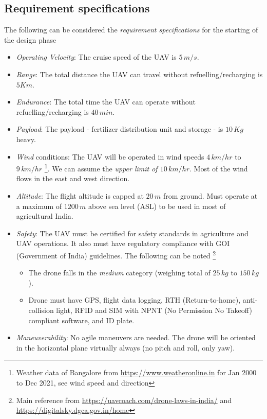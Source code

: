 \subsection{Requirement specifications}

The following can be considered the \emph{requirement specifications} for the starting of the design phase

\begin{itemize}
    \item \textit{Operating Velocity}: The cruise speed of the UAV is $5 \, m/s$.
    \item \textit{Range}: The total distance the UAV can travel without refuelling/recharging is $5 Km$.
    \item \textit{Endurance}: The total time the UAV can operate without refuelling/recharging is $40 \, min$.
    \item \textit{Payload}: The payload - fertilizer distribution unit and storage - is $10 \, Kg$ heavy.
    \item \textit{Wind} conditions: The UAV will be operated in wind speeds $4 \, km/hr$ to $9 \, km/hr$ \footnote{Weather data of Bangalore from \url{https://www.weatheronline.in} for Jan 2000 to Dec 2021, see wind speed and direction}. We can assume the \emph{upper limit of $10 \, km/hr$}. Most of the wind flows in the east and west direction.
    \item \textit{Altitude}: The flight altitude is capped at $20 \, m$ from ground. Must operate at a maximum of $1200\,m$ above sea level (ASL) to be used in most of agricultural India.
    \item \textit{Safety}: The UAV must be certified for safety standards in agriculture and UAV operations. It also must have regulatory compliance with GOI (Government of India) guidelines. The following can be noted \footnote{Main reference from \url{https://uavcoach.com/drone-laws-in-india/} and \url{https://digitalsky.dgca.gov.in/home}}
    \begin{itemize}
        \item The drone falls in the \emph{medium} category (weighing total of $25 \, kg$ to $150 \, kg$).
        \item Drone must have GPS, flight data logging, RTH (Return-to-home), anti-collision light, RFID and SIM with NPNT (No Permission No Takeoff) compliant software, and ID plate.
    \end{itemize}
    \item \textit{Maneuverability}: No agile maneuvers are needed. The drone will be oriented in the horizontal plane virtually always (no pitch and roll, only yaw).
\end{itemize}

